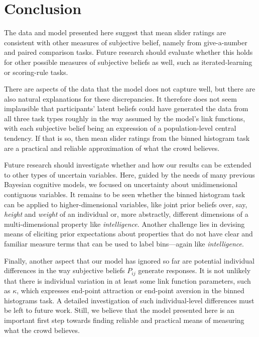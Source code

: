 \documentclass[10pt,letterpaper]{article}
\begin{document}
\section{Conclusion}

The data and model presented here suggest that mean slider ratings are consistent with other
measures of subjective belief, namely from give-a-number and paired comparison tasks. Future
research should evaluate whether this holds for other possible measures of subjective beliefs
as well, such as iterated-learning or scoring-rule tasks. 

There are aspects of the data that the model does not capture well, but there are also natural
explanations for these discrepancies. It therefore does not seem implausible that participants'
latent beliefs could have generated the data from all three task types roughly in the way
assumed by the model's link functions, with each subjective belief being an expression of a
population-level central tendency. If that is so, then mean slider ratings from the binned
histogram task are a practical and reliable approximation of what the crowd believes.

Future research should investigate whether and how our results can be extended to other types
of uncertain variables. Here, guided by the needs of many previous Bayesian cognitive models,
we focused on uncertainty about unidimensional contiguous variables. It remains to be seen
whether the binned histogram task can be applied to higher-dimensional variables, like joint
prior beliefs over, say, \emph{height} and \emph{weight} of an individual or, more abstractly,
different dimensions of a multi-dimensional property like \emph{intelligence}. Another
challenge lies in devising means of eliciting prior expectations about properties that do not
have clear and familiar measure terms that can be used to label bins---again like \emph{intelligence}.

Finally, another aspect that our model has ignored so far are potential individual differences
in the way subjective beliefs $P_{ij}$ generate responses. It is not unlikely that there is
individual variation in at least some link function parameters, such as $\kappa$, which
expresses end-point attraction or end-point aversion in the binned histograms task. A detailed
investigation of such individual-level differences must be left to future work. Still, we
believe that the model presented here is an important first step towards finding reliable and
practical means of measuring what the crowd believes.
\end{document}
